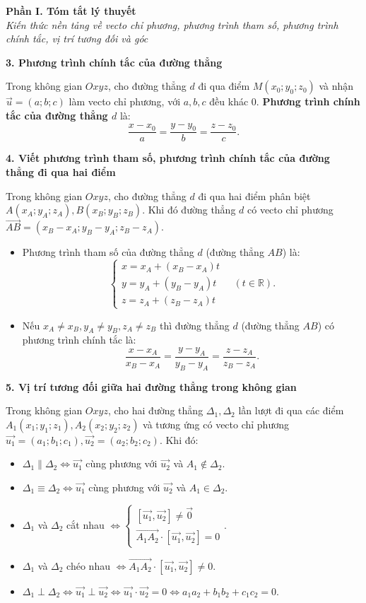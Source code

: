 \documentclass[12pt,a4paper]{article}
\newenvironment{lesson}[2]{
	\vspace{1em}\noindent\textbf{\Large #1}\\
	\textit{#2}\vspace{0.5em}
}{}
\begin{document}
\begin{lesson}{Phần I. Tóm tắt lý thuyết}{Kiến thức nền tảng về vecto chỉ phương, phương trình tham số, phương trình chính tắc, vị trí tương đối và góc}
\textbf{3. Phương trình chính tắc của đường thẳng}

Trong không gian $Oxyz$, cho đường thẳng $d$ đi qua điểm $M(x_0; y_0; z_0)$ và nhận $\vec{u} = (a; b; c)$ làm vecto chỉ phương, với $a, b, c$ đều khác $0$. \textbf{Phương trình chính tắc của đường thẳng $d$} là:
$$\frac{x - x_0}{a} = \frac{y - y_0}{b} = \frac{z - z_0}{c}.$$

\textbf{4. Viết phương trình tham số, phương trình chính tắc của đường thẳng đi qua hai điểm}

Trong không gian $Oxyz$, cho đường thẳng $d$ đi qua hai điểm phân biệt $A(x_A; y_A; z_A), B(x_B; y_B; z_B)$.
Khi đó đường thẳng $d$ có vecto chỉ phương $\vec{AB} = (x_B - x_A; y_B - y_A; z_B - z_A)$.
\begin{itemize}
    \item Phương trình tham số của đường thẳng $d$ (đường thẳng $AB$) là:
    $$\begin{cases} x = x_A + (x_B - x_A)t \\ y = y_A + (y_B - y_A)t \\ z = z_A + (z_B - z_A)t \end{cases} \quad (t \in \mathbb{R}).$$
    \item Nếu $x_A \ne x_B, y_A \ne y_B, z_A \ne z_B$ thì đường thẳng $d$ (đường thẳng $AB$) có phương trình chính tắc là:
    $$\frac{x - x_A}{x_B - x_A} = \frac{y - y_A}{y_B - y_A} = \frac{z - z_A}{z_B - z_A}.$$
\end{itemize}

\textbf{5. Vị trí tương đối giữa hai đường thẳng trong không gian}

Trong không gian $Oxyz$, cho hai đường thẳng $\Delta_1, \Delta_2$ lần lượt đi qua các điểm $A_1(x_1; y_1; z_1), A_2(x_2; y_2; z_2)$ và tương ứng có vecto chỉ phương $\vec{u_1} = (a_1; b_1; c_1), \vec{u_2} = (a_2; b_2; c_2)$. Khi đó:
\begin{itemize}
    \item $\Delta_1 \parallel \Delta_2 \Leftrightarrow \vec{u_1}$ cùng phương với $\vec{u_2}$ và $A_1 \notin \Delta_2$.
    \item $\Delta_1 \equiv \Delta_2 \Leftrightarrow \vec{u_1}$ cùng phương với $\vec{u_2}$ và $A_1 \in \Delta_2$.
    \item $\Delta_1$ và $\Delta_2$ cắt nhau $\Leftrightarrow \begin{cases} [\vec{u_1}, \vec{u_2}] \ne \vec{0} \\ \vec{A_1A_2} \cdot [\vec{u_1}, \vec{u_2}] = 0 \end{cases}$.
    \item $\Delta_1$ và $\Delta_2$ chéo nhau $\Leftrightarrow \vec{A_1A_2} \cdot [\vec{u_1}, \vec{u_2}] \ne 0$.
    \item $\Delta_1 \perp \Delta_2 \Leftrightarrow \vec{u_1} \perp \vec{u_2} \Leftrightarrow \vec{u_1} \cdot \vec{u_2} = 0 \Leftrightarrow a_1a_2 + b_1b_2 + c_1c_2 = 0$.
\end{itemize}


\end{lesson}
\end{document}
